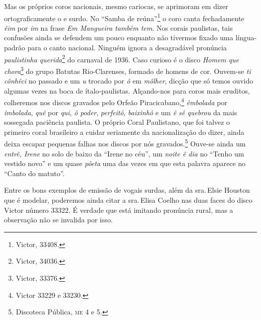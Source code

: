 Mas os próprios coros nacionais, mesmo cariocas, se aprimoram em dizer
ortograficamente o e surdo. No ``Samba de reúna''\footnote{Victor, 33408.} o coro
canta fechadamente \textit{êim} por \textit{im} na frase \textit{Em Mangueira também
tem}. Nos corais paulistas, tais confusões ainda se defendem um pouco
enquanto não tivermos fixado uma língua-padrão para o canto nacional.
Ninguém ignora a desagradável pronúncia \textit{paulistinha querida}\footnote{Victor,
34036.} do carnaval de 1936. Caso curioso é o disco \textit{Homem que chora}\footnote{Victor, 33376.} do grupo Batutas Rio-Clarenses, formado de
homens de cor. Ouvem-se \textit{ti cônhêci} no passado e um \textit{u} trocado por \textit{ô}
em \textit{môlher}, dicção que só temos ouvido algumas vezes na boca de
ítalo-paulistas. Alçando-nos para coros mais eruditos, colheremos nos
discos gravados pelo Orfeão Piracicabano,\footnote{Victor 33229 e 33230.}
\textit{êmbolada} por \textit{imbolada}, \textit{quê} por \textit{qui}, \textit{ô poder},
\textit{perfeitô}, \textit{baixinhô} e um \textit{ê sê quebrou} da mais sossegada
paciência paulista. O próprio Coral Paulistano, que foi talvez o
primeiro coral brasileiro a cuidar seriamente da nacionalização do
dizer, ainda deixa escapar pequenas falhas nos discos por nós gravados.\footnote{Discoteca Pública, \textsc{me} 4 e 5.} Ouve-se ainda um \textit{entrê, Irene} no solo
de baixo da ``Irene no céu'', um \textit{noite ê dia} no ``Tenho um vestido
novo'' e um quase \textit{pôeta} uma das vezes em que esta palavra aparece no
``Canto do matuto''.

Entre os bons exemplos de emissão de vogais surdas, além da sra.\,Elsie
Houston que é modelar, poderemos ainda citar a sra.\,Elisa Coelho nas
duas faces do disco Victor número 33322. É verdade que está imitando
pronúncia rural, mas a observação não se invalida por isso.


